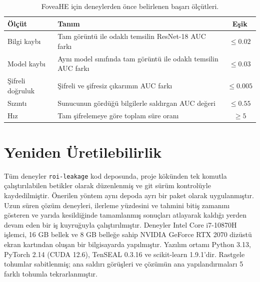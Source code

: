 \begin{table}[h!]
{\setlength{\tabcolsep}{5pt}
\caption{FoveaHE için deneylerden önce belirlenen başarı ölçütleri.}
\begin{center}
\vspace{-6mm}
{\small
\begin{tabular}{lp{9cm}c}
\hline\hline
Ölçüt & Tanım & Eşik \\
\hline
Bilgi kaybı & Tam görüntü ile odaklı temsilin ResNet-18 AUC farkı & $\leq 0.02$ \\
Model kaybı & Aynı model sınıfında tam görüntü ile odaklı temsilin AUC farkı & $\leq 0.03$ \\
Şifreli doğruluk & Şifreli ve şifresiz çıkarımın AUC farkı & $\leq 0.005$ \\
Sızıntı & Sunucunun gördüğü bilgilerle saldırgan AUC değeri & $\leq 0.55$ \\
Hız & Tam şifrelemeye göre toplam süre oranı & $\geq 5$ \\
\hline
\end{tabular}}
\vspace{-6mm}
\end{center}
\label{tbl:olcutler}}
\end{table}

\section{Yeniden Üretilebilirlik}\label{sec:repro}

Tüm deneyler \texttt{roi-leakage} kod deposunda, proje kökünden tek komutla çalıştırılabilen betikler olarak düzenlenmiş ve git sürüm kontrolüyle kaydedilmiştir. Önerilen yöntem aynı depoda ayrı bir paket olarak uygulanmıştır. Uzun süren çözüm deneyleri, ilerleme yüzdesini ve tahmini bitiş zamanını gösteren ve yarıda kesildiğinde tamamlanmış sonuçları atlayarak kaldığı yerden devam eden bir iş kuyruğuyla çalıştırılmıştır. Deneyler Intel Core i7-10870H işlemci, 16 GB bellek ve 8 GB belleğe sahip NVIDIA GeForce RTX 2070 dizüstü ekran kartından oluşan bir bilgisayarda yapılmıştır. Yazılım ortamı Python 3.13, PyTorch 2.14 (CUDA 12.6), TenSEAL 0.3.16 ve scikit-learn 1.9.1'dir. Rastgele tohumlar sabitlenmiş; ana saldırı görüşleri ve çözümün ana yapılandırmaları 5 farklı tohumla tekrarlanmıştır.

